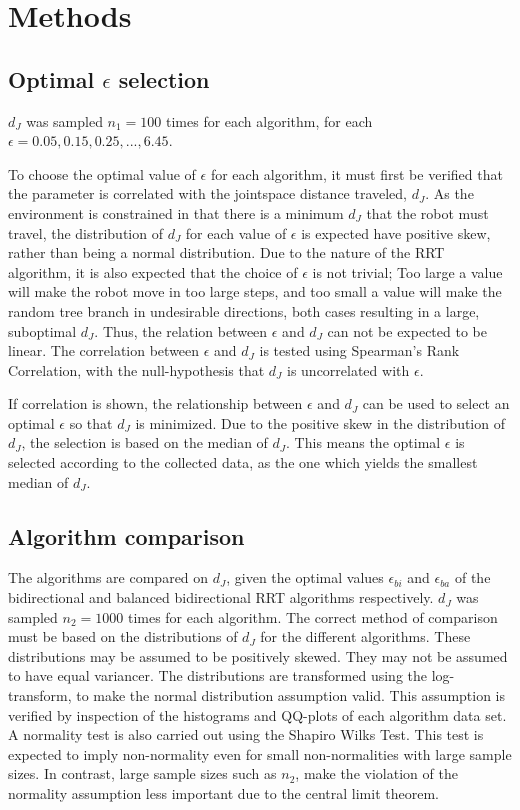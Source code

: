 \section{Methods}
\subsection{Optimal \(\epsilon\) selection}
\(d_J\) was sampled \(n_1=100\) times for each algorithm,
for each \(\epsilon = 0.05, 0.15, 0.25, ..., 6.45\).

To choose the optimal value of \(\epsilon\) for each algorithm,
it must first be verified that the parameter is correlated
with the jointspace distance traveled, \(d_J\).
As the environment is constrained in that there is a minimum \(d_J\)
that the robot must travel, the distribution of \(d_J\) for each
value of \(\epsilon\) is expected have positive skew,
rather than being a normal distribution.
Due to the nature of the RRT algorithm, it is also expected that
the choice of \(\epsilon\) is not trivial;
Too large a value will make the robot move in too large steps,
and too small a value will make the random tree branch in
undesirable directions, both cases resulting in a large, suboptimal \(d_J\).
Thus, the relation between \(\epsilon\) and \(d_J\) can not be expected to be linear.
The correlation between \(\epsilon\) and \(d_J\) is tested using
Spearman's Rank Correlation, with the null-hypothesis that \(d_J\)
is uncorrelated with \(\epsilon\).

If correlation is shown, the relationship
between \(\epsilon\) and \(d_J\) can be used
to select an optimal \(\epsilon\) so that
\(d_J\) is minimized.
Due to the positive skew in the distribution
of \(d_J\), the selection is based on the median
of \(d_J\).
This means the optimal \(\epsilon\) is selected
according to the collected data,
as the one which yields the smallest median of \(d_J\).

\subsection{Algorithm comparison}
The algorithms are compared on \(d_J\),
given the optimal values \(\epsilon_{bi}\) and \(\epsilon_{ba}\)
of the bidirectional and balanced bidirectional RRT algorithms respectively.
\(d_J\) was sampled \(n_2=1000\) times for each algorithm.
The correct method of comparison must be based
on the distributions of \(d_J\) for the different algorithms.
These distributions may be assumed to be positively skewed.
They may not be assumed to have equal variancer.
The distributions are transformed using the log-transform,
to make the normal distribution assumption valid.
This assumption is verified by inspection of the histograms
and QQ-plots of each algorithm data set.
A normality test is also carried out using the Shapiro Wilks Test.
This test is expected to imply non-normality even for small
non-normalities with large sample sizes. In contrast,
large sample sizes such as \(n_2\), make the violation of the normality assumption
less important due to the central limit theorem.

